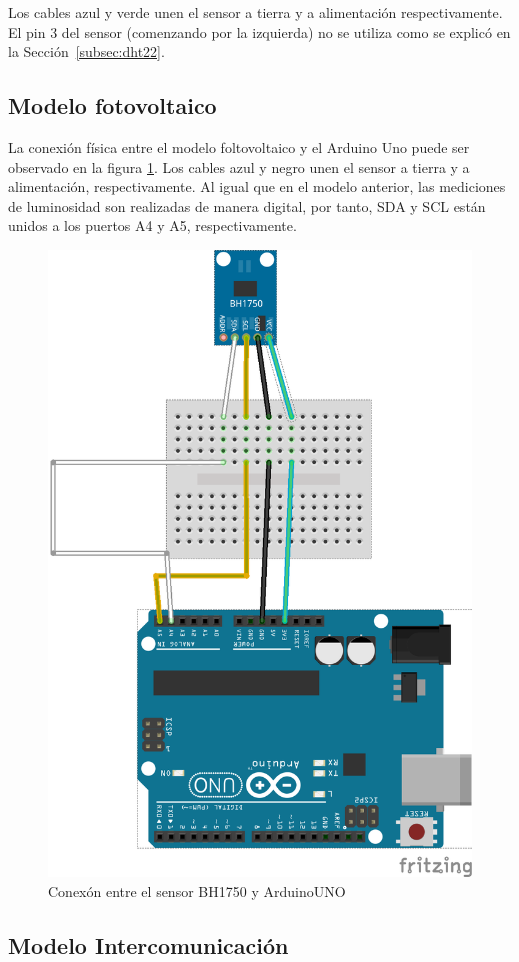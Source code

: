 Los cables azul y verde unen el sensor a tierra y a alimentaci\'on
respectivamente.
El pin 3 del sensor (comenzando por la izquierda) no se utiliza como
se explic\'o en la Secci\'on~\ref{subsec:dht22}.


\subsection{Modelo fotovoltaico}
La conexi\'on f\'isica entre el modelo foltovoltaico y el Arduino Uno
puede ser observado en la figura \ref{fig:bh1750}. Los cables azul y
negro unen el sensor a tierra y a alimentaci\'on, respectivamente.
Al igual que en el modelo anterior, las mediciones de luminosidad son
realizadas de manera digital, por tanto, SDA y SCL est\'an unidos a los puertos A4 y A5, respectivamente.

\begin{center}
\begin{figure}[h]\label{fig:bh1750}
\includegraphics{images/bh1750_bb.png}
\caption{Conex\'on entre el sensor BH1750 y ArduinoUNO}

\end{figure}
\end{center}
\subsection{Modelo Intercomunicaci\'on}\label{sec:mod-intercom}
